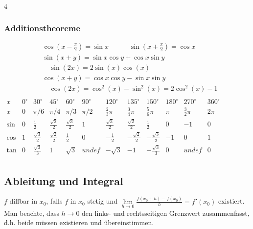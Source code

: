 \documentclass[6pt,a4paper]{scrartcl}
\newcommand{\enbrace}[1]{\ensuremath{\left(#1\right)}}
\begin{document}
\begin{multicols*}{4}
    \subsubsection{Additionstheoreme} %
    \label{par:additionstheoreme}
    \begin{eqnarray*}
        & \cos \enbrace{x - \frac{\pi}{2}} = \sin x \qquad \quad \sin \enbrace{x + \frac{\pi}{2}} = \cos x \\
        & \sin \enbrace{x + y} = \sin x \cos y + \cos x \sin y \\
        & \quad \sin (2x) = 2 \sin (x) \cos (x)        \\
        & \cos (x + y) = \cos x \cos y - \sin x \sin y \\
        & \quad \cos (2x) = \cos^2 (x) - \sin^2 (x) = 2\cos^2 (x) - 1\\
    \end{eqnarray*}
    \hspace{-20pt}
    \scalebox{0.77}
    {
        $\begin{array}{c|c|c|c|c|c|c|c|c|c|c|c}
                x    & 0^{\circ} & 30^{\circ}         & 45^{\circ}         & 60^{\circ}        & 90^{\circ} & 120^{\circ}       & 135^{\circ}         & 150^{\circ}         & 180^{\circ} & 270^{\circ}    & 360^{\circ} \\ \hline
                x    & 0         & \pi / 6            & \pi / 4            & \pi / 3           & \pi / 2    & \frac{2}{3}\pi    & \frac{3}{4}\pi      & \frac{5}{6}\pi      & \pi         & \frac{3}{2}\pi & 2 \pi       \\ \hline
                \sin & 0         & \frac{1}{2}        & \frac{\sqrt{2}}{2} & \frac{\sqrt 3}{2} & 1          & \frac{\sqrt 3}{2} & \frac{\sqrt{2}}{2}  & \frac{1}{2}         & 0           & -1             & 0           \\
                \cos & 1         & \frac{\sqrt 3}{2}  & \frac{\sqrt{2}}{2} & \frac{1}{2}       & 0          & -\frac{1}{2}      & -\frac{\sqrt{2}}{2} & -\frac{\sqrt 3}{2}  & -1          & 0              & 1           \\
                \tan & 0         & \frac{\sqrt{3}}{3} & 1                  & \sqrt{3}          & undef      & -\sqrt{3}         & -1                  & -\frac{\sqrt{3}}{3} & 0           & undef          & 0           \\
            \end{array}$
    }


    \subsection{Ableitung und Integral}
    $f$ diffbar in $x_0$, falls $f$ in $x_0$ stetig und $\underset{h\rightarrow 0}{\lim}\frac{f(x_0+h)-f(x_0)}{h}=f'(x_0)$ existiert.
    \\
    Man beachte, dass $h\rightarrow0$ den links- und rechtsseitigen Grenzwert zusammenfasst, d.h. beide müssen existieren und übereinstimmen.\\


\end{multicols*}
\end{document}
